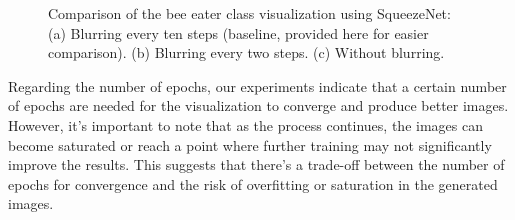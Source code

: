 \begin{figure}[H]
\begin{subfigure}[t]{.33\textwidth}
        \caption{}
        \label{fig:class_viz_blur:sub3}
    \end{subfigure}
    \caption{Comparison of the bee eater class visualization using SqueezeNet: (a) Blurring every ten steps (baseline, provided here for easier comparison). (b) Blurring every two steps. (c) Without blurring.} %
    \label{fig:class_viz_blur}
\end{figure}


Regarding the number of epochs, our experiments indicate that a certain number of epochs are needed for the visualization to converge and produce better images. However, it's important to note that as the process continues, the images can become saturated or reach a point where further training may not significantly improve the results. This suggests that there's a trade-off between the number of epochs for convergence and the risk of overfitting or saturation in the generated images.

